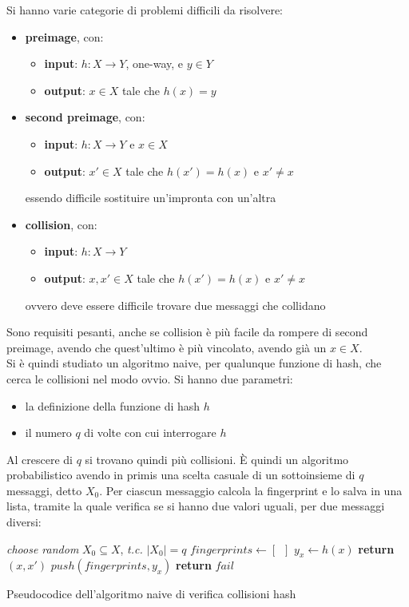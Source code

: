 \documentclass[a4paper,12pt, oneside]{book}
\begin{document}
Si hanno varie categorie di problemi difficili da risolvere:
\begin{itemize}
  \item \textbf{preimage}, con:
  \begin{itemize}
    \item \textbf{input}: $h:X\to Y$, one-way, e $y\in Y$
    \item \textbf{output}: $x\in X$ tale che $h(x)=y$
  \end{itemize}
  \item \textbf{second preimage}, con:
  \begin{itemize}
    \item \textbf{input}: $h:X\to Y$ e $x\in X$
    \item \textbf{output}: $x'\in X$ tale che $h(x')=h(x)$ e $x'\neq x$
  \end{itemize}
  essendo difficile sostituire un'impronta con un'altra
  \item \textbf{collision}, con:
  \begin{itemize}
    \item \textbf{input}: $h:X\to Y$
    \item \textbf{output}: $x,x'\in X$ tale che $h(x')=h(x)$ e $x'\neq x$
  \end{itemize}
  ovvero deve essere difficile trovare due messaggi che collidano
\end{itemize}
Sono requisiti pesanti, anche se collision è più facile da rompere di second
preimage, avendo che quest'ultimo è più vincolato, avendo già un $x\in X$. \\
Si è quindi studiato un algoritmo naive, per qualunque funzione di hash, che
cerca le collisioni nel modo ovvio. Si hanno due parametri:
\begin{itemize}
  \item la definizione della funzione di hash $h$
  \item il numero $q$ di volte con cui interrogare $h$
\end{itemize}
Al crescere di $q$ si trovano quindi più collisioni. È quindi un algoritmo
probabilistico avendo in primis una scelta casuale di un sottoinsieme di $q$
messaggi, detto $X_0$. Per ciascun messaggio calcola la fingerprint e lo salva
in una lista, tramite la quale verifica se si hanno due valori uguali, per due
messaggi diversi:
\begin{algorithm}[H]
  \small
  \begin{algorithmic}
    \State \textit{choose random }$X_0\subseteq X$, \textit{t.c.} $|X_0|=q$
    \State $fingerprints\gets [\,\,\,]$
    \State $y_x\gets h(x)$
    \State \textbf{return} $(x,x')$
    \Else
    \State $push(fingerprints, y_x)$
    \EndIf
    \EndFor
    \State \textbf{return} $fail$
    \EndFunction
  \end{algorithmic}
  \label{algo:h1}
  \caption{Pseudocodice dell'algoritmo naive di verifica collisioni hash}
\end{algorithm}
\end{document}
